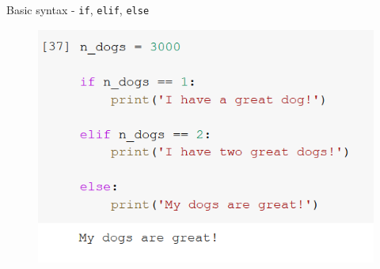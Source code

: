 \documentclass[aspectratio=169]{beamer}
\begin{document}
\begin{frame}{Basic syntax - \texttt{if}, \texttt{elif}, \texttt{else}}
\begin{multicols}{3}
\begin{figure}
			\centering
			\includegraphics[width=\linewidth]{img/else.png}
		\end{figure}

	\end{multicols}

\end{frame}
\end{document}
